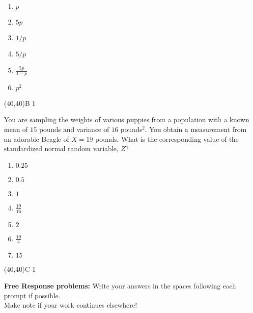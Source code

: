 \documentclass[addpoints]{exam}
\def\solutions{0}
\begin{document}
{\begin{questions}
\begin{minipage}[b]{.85\textwidth}
	\begin{enumerate}[label=\Alph*.]
		\item $p$
		\item $5p$
		\item $1/p$
		\item $5/p$
		\item $\frac{5p}{1-p}$
		\item $p^2$
	\end{enumerate}
\end{minipage}
\begin{minipage}[b]{.1\textwidth}
	\vspace{\fill}\framebox(40,40){B \if\solutions1 \fi}
\end{minipage}
\clearpage


\question[3] You are sampling the weights of various puppies from a population with a known mean of $15$ pounds and variance of $16$ pounds$^2$. You obtain a measurement from an adorable Beagle of $X = 19$ pounds. What is the corresponding value of the standardized normal random variable, $Z$?

\begin{minipage}[b]{.85\textwidth}
	\begin{enumerate}[label=\Alph*.]
		\item $0.25$
		\item $0.5$
		\item $1$
		\item $\frac{19}{16}$
		\item $2$
		\item $\frac{19}{4}$
		\item $15$
	\end{enumerate}
\end{minipage}
\begin{minipage}[b]{.1\textwidth}
	\vspace{\fill}\framebox(40,40){C \if\solutions1 \fi}
\end{minipage}

{\begin{center} {\bf Free Response problems:} Write your answers in the spaces following each prompt if possible.\\  Make note if your work continues elsewhere!\end{center}}\vspace{2mm}


\end{questions}}
\end{document}

